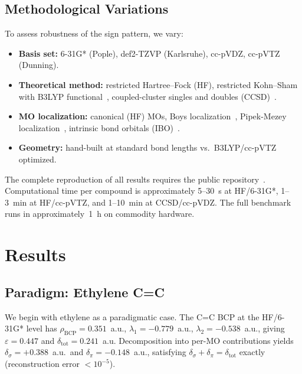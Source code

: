 \documentclass[twoside,natbib]{svjour3}
\newcommand{\delsg}{\delta_{\sigma}}
\newcommand{\delpi}{\delta_{\pi}}
\newcommand{\eps}{\varepsilon}
\begin{document}
\subsection{Methodological Variations}

To assess robustness of the sign pattern, we vary:

\begin{itemize}
\item \textbf{Basis set:} 6-31G* (Pople), def2-TZVP (Karlsruhe),
cc-pVDZ, cc-pVTZ (Dunning).
\item \textbf{Theoretical method:} restricted Hartree--Fock (HF),
restricted Kohn--Sham with B3LYP functional~\citep{Becke1993,Stephens1994},
coupled-cluster singles and doubles (CCSD)~\citep{Purvis1982}.
\item \textbf{MO localization:} canonical (HF) MOs, Boys
localization~\citep{Boys1960}, Pipek-Mezey
localization~\citep{Pipek1989}, intrinsic bond
orbitals (IBO)~\citep{Knizia2013}.
\item \textbf{Geometry:} hand-built at standard bond lengths vs.\
B3LYP/cc-pVTZ optimized.
\end{itemize}

The complete reproduction of all results requires the public
repository~\citep{Zhou2026code,Zhou2026data}. Computational time
per compound is approximately 5--30~s at HF/6-31G*, 1--3~min at
HF/cc-pVTZ, and 1--10~min at CCSD/cc-pVDZ. The full benchmark
runs in approximately~1~h on commodity hardware.

\section{Results}
\label{sec:results}

\subsection{Paradigm: Ethylene C=C}
\label{sec:results_ethylene}

We begin with ethylene as a paradigmatic case. The C=C BCP at the
HF/6-31G* level has $\rho_{\text{BCP}} = 0.351$~a.u.,
$\lambda_1 = -0.779$~a.u., $\lambda_2 = -0.538$~a.u.,
giving $\eps = 0.447$ and $\delta_{\text{tot}} = 0.241$~a.u.
Decomposition into per-MO contributions yields $\delsg = +0.388$~a.u.\
and $\delpi = -0.148$~a.u., satisfying $\delsg + \delpi = \delta_{\text{tot}}$
exactly (reconstruction error $< 10^{-5}$).
\end{document}
